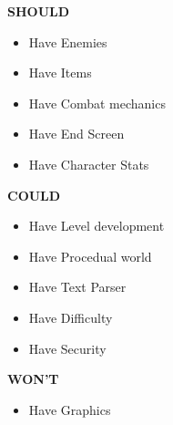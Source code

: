 \textbf{SHOULD}
\begin{itemize}

\item Have Enemies\\
\item Have Items\\
\item Have Combat mechanics\\
\item Have End Screen\\
\item Have Character Stats\\
 
\end{itemize}

\textbf{COULD}

\begin{itemize}

\item Have Level development\\
\item Have Procedual world\\
\item Have Text Parser\\
\item Have Difficulty\\
\item Have Security\\

\end{itemize}

\textbf{WON'T}
\begin{itemize}
\item Have Graphics
\end{itemize}

 